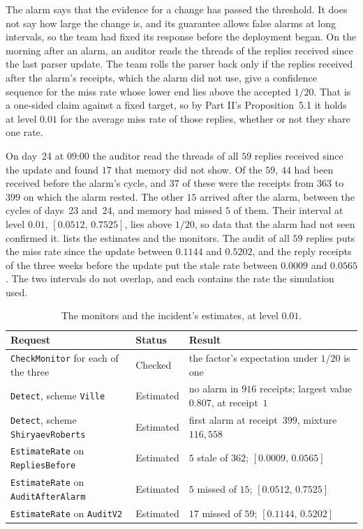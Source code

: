 \documentclass[11pt]{article}
\newcommand{\code}[1]{\texttt{#1}}
\theoremstyle{definition}
\theoremstyle{plain}
\begin{document}
The alarm says that the evidence for a change has passed the threshold. It does not say how large
the change is, and its guarantee allows false alarms at long intervals, so the team had fixed its
response before the deployment began. On the morning after an alarm, an auditor reads the threads
of the replies received since the last parser update. The team rolls the parser back only if the
replies received after the alarm's receipts, which the alarm did not use, give a confidence
sequence for the miss rate whose lower end lies above the accepted $1/20$. That is a one-sided
claim against a fixed target, so by Part II's Proposition~5.1 it holds at level $0.01$ for the
average miss rate of those replies, whether or not they share one rate.

On day~24 at 09:00 the auditor read the threads of all $59$ replies received since the update and
found $17$ that memory did not show. Of the $59$, $44$ had been received before the alarm's cycle,
and $37$ of these were the receipts from $363$ to $399$ on which the alarm rested. The other $15$
arrived after the alarm, between the cycles of days~23 and~24, and memory had missed $5$ of them.
Their interval at level $0.01$, $[0.0512,\,0.7525]$, lies above $1/20$, so data that the alarm had
not seen confirmed it.  lists the estimates and the monitors. The audit of all
$59$ replies puts the miss rate since the update between $0.1144$ and $0.5202$, and the reply
receipts of the three weeks before the update put the stale rate between $0.0009$ and $0.0565$. The
two intervals do not overlap, and each contains the rate the simulation used.

\begin{table}[ht]
\centering\small
\begin{tabularx}{\textwidth}{>{\raggedright\arraybackslash}p{5.4cm}>{\raggedright\arraybackslash}p{1.7cm}X}
\toprule
Request & Status & Result\\
\midrule
\code{CheckMonitor} for each of the three & Checked & the factor's expectation under $1/20$ is
one\\
\code{Detect}, scheme \code{Ville} & Estimated & no alarm in $916$ receipts; largest value $0.807$,
at receipt~$1$\\
\code{Detect}, scheme \code{ShiryaevRoberts} & Estimated & first alarm at receipt~$399$, mixture
$116{,}558$\\
\code{EstimateRate} on \code{RepliesBefore} & Estimated & $5$ stale of $362$;
$[0.0009,\,0.0565]$\\
\code{EstimateRate} on \code{AuditAfterAlarm} & Estimated & $5$ missed of $15$;
$[0.0512,\,0.7525]$\\
\code{EstimateRate} on \code{AuditV2} & Estimated & $17$ missed of $59$; $[0.1144,\,0.5202]$\\
\bottomrule
\end{tabularx}
\caption{The monitors and the incident's estimates, at level $0.01$.}\label{tab:incident}
\end{table}
\end{document}
